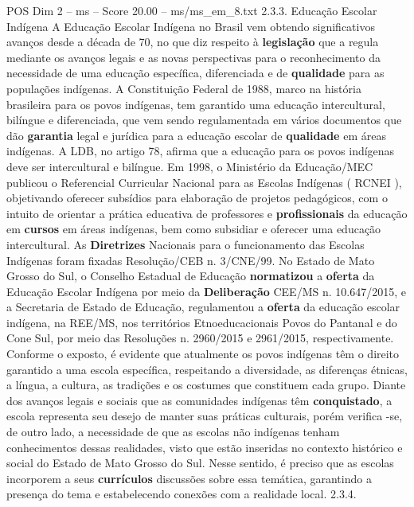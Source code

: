 \begin{textsample}{POS Dim 2 – ms – Score 20.00 – ms/ms\_em\_8.txt}  \label{ex:f2_pos_046}
2.3.3.
Educação Escolar Indígena A Educação Escolar Indígena no Brasil vem obtendo significativos avanços desde a década de 70, no que diz respeito à \textbf{legislação} que a regula mediante os avanços legais e as novas perspectivas para o reconhecimento da necessidade de uma educação específica, diferenciada e de \textbf{qualidade} para as populações indígenas.
A Constituição Federal de 1988, marco na história brasileira para os povos indígenas, tem garantido uma educação intercultural, bilíngue e diferenciada, que vem sendo regulamentada em vários documentos que dão \textbf{garantia} legal e jurídica para a educação escolar de \textbf{qualidade} em áreas indígenas.
A LDB, no artigo 78, afirma que a educação para os povos indígenas deve ser intercultural e bilíngue.
Em 1998, o Ministério da Educação/MEC publicou o Referencial Curricular Nacional para as Escolas Indígenas ( RCNEI ), objetivando oferecer subsídios para elaboração de projetos pedagógicos, com o intuito de orientar a prática educativa de professores e \textbf{profissionais} da educação em \textbf{cursos} em áreas indígenas, bem como subsidiar e oferecer uma educação intercultural.
As \textbf{Diretrizes} Nacionais para o funcionamento das Escolas Indígenas foram fixadas Resolução/CEB n. 3/CNE/99.
No Estado de Mato Grosso do Sul, o Conselho Estadual de Educação \textbf{normatizou} a \textbf{oferta} da Educação Escolar Indígena por meio da \textbf{Deliberação} CEE/MS n. 10.647/2015, e a Secretaria de Estado de Educação, regulamentou a \textbf{oferta} da educação escolar indígena, na REE/MS, nos territórios Etnoeducacionais Povos do Pantanal e do Cone Sul, por meio das Resoluções n. 2960/2015 e 2961/2015, respectivamente.
Conforme o exposto, é evidente que atualmente os povos indígenas têm o direito garantido a uma escola específica, respeitando a diversidade, as diferenças étnicas, a língua, a cultura, as tradições e os costumes que constituem cada grupo.
Diante dos avanços legais e sociais que as comunidades indígenas têm \textbf{conquistado}, a escola representa seu desejo de manter suas práticas culturais, porém verifica -se, de outro lado, a necessidade de que as escolas não indígenas tenham conhecimentos dessas realidades, visto que estão inseridas no contexto histórico e social do Estado de Mato Grosso do Sul.
Nesse sentido, é preciso que as escolas incorporem a seus \textbf{currículos} discussões sobre essa temática, garantindo a presença do tema e estabelecendo conexões com a realidade local. 2.3.4.

\end{textsample}
